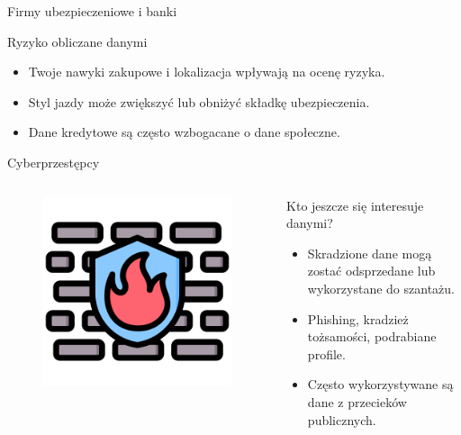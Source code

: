     \begin{frame}{Firmy ubezpieczeniowe i banki}
    \begin{alertblock}{Ryzyko obliczane danymi}
        \begin{itemize}
          \item Twoje nawyki zakupowe i lokalizacja wpływają na ocenę ryzyka.
          \item Styl jazdy może zwiększyć lub obniżyć składkę ubezpieczenia.
          \item Dane kredytowe są często wzbogacane o dane społeczne.
        \end{itemize}
    \end{alertblock}
    \end{frame}
    
    \begin{frame}{Cyberprzestępcy}
    \begin{columns}[c]
        \begin{figure}
          \centering
          \includegraphics[height=0.45\textheight]{images/firewall.png}
        \end{figure}
        \begin{alertblock}{Kto jeszcze się interesuje danymi?}
            \begin{itemize}
              \item Skradzione dane mogą zostać odsprzedane lub wykorzystane do szantażu.
              \item Phishing, kradzież tożsamości, podrabiane profile.\cite{PHISHING_REPORT}
              \item Często wykorzystywane są dane z przecieków publicznych.
            \end{itemize}
        \end{alertblock}
    \end{columns}
    \end{frame}
    
